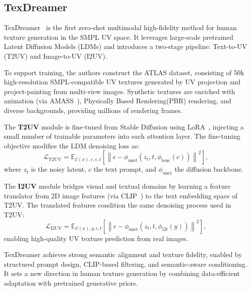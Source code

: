 \subsection{TexDreamer}

TexDreamer~\cite{liu2024texdreamer} is the first zero-shot multimodal high-fidelity method for human texture generation in the SMPL UV space. It leverages large-scale pretrained Latent Diffusion Models (LDMs) and introduces a two-stage pipeline: Text-to-UV (T2UV) and Image-to-UV (I2UV).

To support training, the authors construct the ATLAS dataset, consisting of 50k high-resolution SMPL-compatible UV textures generated by UV projection and project-painting from multi-view images. Synthetic textures are enriched with animation (via AMASS~\cite{AMASS:ICCV:2019}), Physically Based Rendering(PBR) rendering, and diverse backgrounds, providing millions of rendering frames.

The \textbf{T2UV} module is fine-tuned from Stable Diffusion using LoRA~\cite{hu2022lora}, injecting a small number of trainable parameters into each attention layer. The fine-tuning objective modifies the LDM denoising loss as:
\begin{equation}
\mathcal{L}_{\text{T2UV}} = \mathbb{E}_{\mathcal{E}(x), c, \epsilon, t} \left[\left\|\epsilon - \phi_{\text{unet}}(z_t, t, \phi_{\text{tenc}}(c))\right\|^2\right],
\end{equation}
where $z_t$ is the noisy latent, $c$ the text prompt, and $\phi_{\text{unet}}$ the diffusion backbone.

The \textbf{I2UV} module bridges visual and textual domains by learning a feature translator from 2D image features (via CLIP~\cite{radford2021learningtransferablevisualmodels}) to the text embedding space of T2UV. The translated features condition the same denoising process used in T2UV:
\begin{equation}
\mathcal{L}_{\text{I2UV}} = \mathbb{E}_{\mathcal{E}(x), y, \epsilon, t} \left[\left\|\epsilon - \phi_{\text{unet}}(z_t, t, \phi_{i2t}(y))\right\|^2\right],
\end{equation}
enabling high-quality UV texture prediction from real images.

TexDreamer achieves strong semantic alignment and texture fidelity, enabled by structured prompt design, CLIP-based filtering, and semantic-aware conditioning. It sets a new direction in human texture generation by combining data-efficient adaptation with pretrained generative priors.


